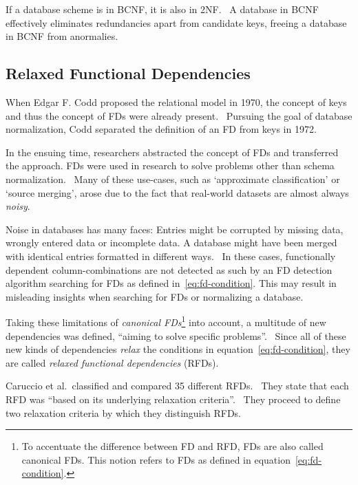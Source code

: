 If a database scheme is in BCNF, it is also in 2NF.~\cite[p.~58]{SCH17} A database in BCNF effectively eliminates redundancies apart from candidate keys, freeing a database in BCNF from anormalies.~\cite[p.~67]{SCH17}


\subsection{Relaxed Functional Dependencies}
When Edgar F. Codd proposed the relational model in 1970, the concept of keys and thus the concept of FDs were already present.~\cite[p.~70]{MAI83}
Pursuing the goal of database normalization, Codd separated the definition of an FD from keys in 1972.

In the ensuing time, researchers abstracted the concept of FDs and transferred the approach.
FDs were used in research to solve problems other than schema normalization.~\cite[p.~161]{CAR16}
Many of these use-cases, such as `approximate classification' or `source merging', arose due to the fact that real-world datasets are almost always \emph{noisy}.

Noise in databases has many faces:
Entries might be corrupted by missing data, wrongly entered data or incomplete data.
A database might have been merged with identical entries formatted in different ways.~\cite[p.~1]{KOU09}
In these cases, functionally dependent column-combinations are not detected as such by an FD detection algorithm searching for FDs as defined in~\ref{eq:fd-condition}.
This may result in misleading insights when searching for FDs or normalizing a database.

Taking these limitations of \emph{canonical FDs}\footnote{To accentuate the difference between FD and RFD, FDs are also called canonical FDs. This notion refers to FDs as defined in equation~\ref{eq:fd-condition}.} into account, a multitude of new dependencies was defined, ``aiming to solve specific problems''.~\cite[p.~147]{CAR16}
Since all of these new kinds of dependencies \emph{relax} the conditions in equation~\ref{eq:fd-condition}, they are called \emph{relaxed functional dependencies} (RFDs).

Caruccio et al.\ classified and compared 35 different RFDs.~\cite[p.~151]{CAR16}
They state that each RFD was ``based on its underlying relaxation criteria''.~\cite[p.~149]{CAR16}
They proceed to define two relaxation criteria by which they distinguish RFDs.

